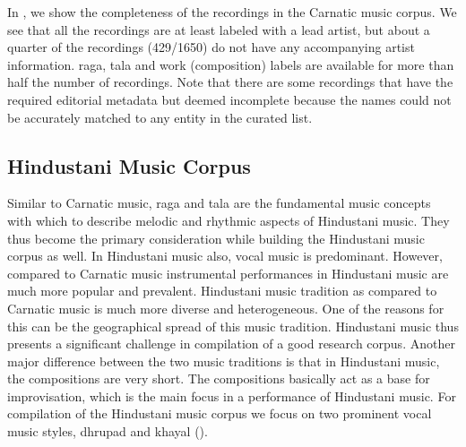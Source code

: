 In , we show the completeness of the recordings in the Carnatic music corpus. We see that all the recordings are at least labeled with a lead artist, but about a quarter of the recordings (429/1650) do not have any accompanying artist information. \Gls{raga}, \gls{tala} and work (composition) labels are available for more than half the number of recordings. Note that there are some recordings that have the required editorial metadata but deemed incomplete because the names could not be accurately matched to any entity in the curated list. 


\subsection{Hindustani Music Corpus}
\label{sec:corpus_hindustani_music_corpus}

Similar to Carnatic music, \gls{raga} and \gls{tala} are the fundamental music concepts with which to describe melodic and rhythmic aspects of Hindustani music. They thus become the primary consideration while building the Hindustani music corpus as well. In Hindustani music also, vocal music is predominant. However, compared to Carnatic music instrumental performances in Hindustani music are much more popular and prevalent. Hindustani music tradition as compared to Carnatic music is much more diverse and heterogeneous. One of the reasons for this can be the geographical spread of this music tradition. Hindustani music thus presents a significant challenge in compilation of a good research corpus. Another major difference between the two music traditions is that in Hindustani music, the compositions are very short. The compositions basically act as a base for improvisation, which is the main focus in a performance of Hindustani music. For compilation of the Hindustani music corpus we focus on two prominent vocal music styles, \gls{dhrupad} and \gls{khayal} (). %

